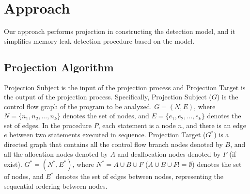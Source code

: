 \section{Approach}\label{sec:approach}
Our approach performs projection in constructing the detection model, and it simplifies memory leak detection procedure based on the model.

\subsection{Projection Algorithm}


Projection Subject is the input of the projection process and Projection Target is the output of the projection process. Specifically, Projection Subject ($G$) is the control flow graph of the program to be analyzed. $G=(N, E)$, where $N = \{n_1, n_2, \ldots, n_k\}$ denotes the set of nodes, and $E = \{e_1, e_2, \ldots, e_k\}$ denotes the set of edges. In the procedure $P$, each statement is a node $n$, and there is an edge $e$ between two statements executed in sequence. Projection Target ($G^*$) is a directed graph that contains all the control flow branch nodes denoted by $B$, and all the allocation nodes denoted by $A$ and deallocation nodes denoted by $F$ (if exist). $G^* = (N^*, E^*)$, where $N^* = A\cup B\cup F$ ($A\cup B\cup F!=\emptyset$) denotes the set of nodes, and $E^*$ denotes the set of edges between nodes, representing the sequential ordering between nodes.


